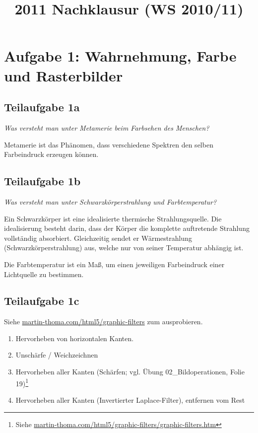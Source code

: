 \documentclass[a4paper]{scrartcl}
\begin{document}
\title{2011 Nachklausur (WS 2010/11)}

\setcounter{section}{1}
\section*{Aufgabe 1: Wahrnehmung, Farbe und Rasterbilder}
\subsection*{Teilaufgabe 1a}
\textit{Was versteht man unter Metamerie beim Farbsehen des Menschen?}

Metamerie ist das Phänomen, dass verschiedene Spektren den selben Farbeindruck
erzeugen können.

\subsection*{Teilaufgabe 1b}
\textit{Was versteht man unter Schwarzkörperstrahlung und Farbtemperatur?}

Ein Schwarzkörper ist eine idealisierte thermische Strahlungsquelle. Die
idealisierung besteht darin, dass der Körper die komplette auftretende
Strahlung vollständig absorbiert. Gleichzeitig sendet er Wärmestrahlung
(Schwarzkörperstrahlung) aus, welche nur von seiner Temperatur abhängig ist.

Die Farbtemperatur ist ein Maß, um einen jeweiligen Farbeindruck einer
Lichtquelle zu bestimmen.

\subsection*{Teilaufgabe 1c}
Siehe \href{https://martin-thoma.com/html5/graphic-filters/graphic-filters.htm}{martin-thoma.com/html5/graphic-filters} zum ausprobieren.

\begin{enumerate}[label=(\Alph*)]
    \item Hervorheben von horizontalen Kanten.
    \item Unschärfe / Weichzeichnen
    \item Hervorheben aller Kanten (Schärfen; vgl. Übung 02\_Bildoperationen, Folie 19)\footnote{Siehe \href{https://martin-thoma.com/html5/graphic-filters/graphic-filters.htm?k1=0&k2=-1&k3=0&k4=-1&k5=5&k6=-1&k7=0&k8=-1&k9=0}{martin-thoma.com/html5/graphic-filters/graphic-filters.htm}}
    \item Hervorheben aller Kanten (Invertierter Laplace-Filter), entfernen vom
          Rest
\end{enumerate}
\end{document}

